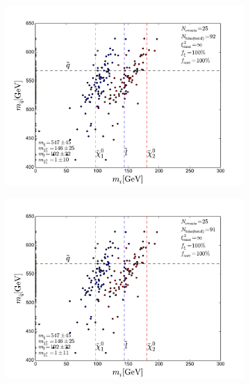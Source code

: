 \documentclass[twoside,english]{uiofysmaster}
\begin{document}
\begin{figure}[hbt]
	\centering
	\begin{subfigure}[b]{0.45\textwidth}
		\includegraphics[width=\textwidth]{figures/improving_combinatorics/herwigpp_10psmear_lowtol_nocomb_TMP.pdf} 
		\caption{ }
	\end{subfigure}
	\begin{subfigure}[b]{0.45\textwidth}
		\includegraphics[width=\textwidth]{figures/improving_combinatorics/herwigpp_10psmear_lowtol_nocomb_400-300-200-100.pdf}
		\caption{ } 
	\end{subfigure}


\end{figure}
\end{document}
